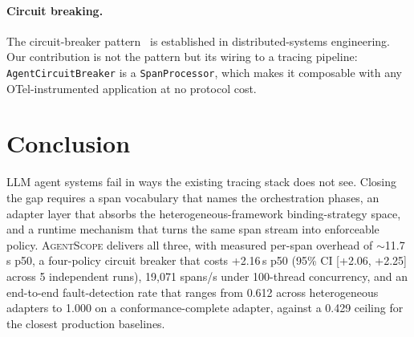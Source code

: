 \documentclass[sigplan,10pt,anonymous,review]{acmart}
\newcommand{\sysname}{\textsc{AgentScope}\xspace}
\begin{document}
\paragraph{Circuit breaking.}
The circuit-breaker pattern~\cite{circuit_breaker_pattern} is
established in distributed-systems engineering. Our contribution is
not the pattern but its wiring to a tracing pipeline:
\texttt{AgentCircuitBreaker} is a \texttt{SpanProcessor}, which makes
it composable with any OTel-instrumented application at no protocol
cost.

\section{Conclusion}
\label{sec:conclusion}

LLM agent systems fail in ways the existing tracing stack does not
see. Closing the gap requires a span vocabulary that names the
orchestration phases, an adapter layer that absorbs the
heterogeneous-framework binding-strategy space, and a runtime
mechanism that turns the same span stream into enforceable policy.
\sysname{} delivers all three, with measured per-span overhead of
$\sim$11.7\,\textmu{}s p50, a four-policy circuit breaker that costs
+2.16\,\textmu{}s p50 (95\% CI [+2.06, +2.25] across 5 independent
runs), 19{,}071 spans/s under 100-thread concurrency, and an
end-to-end fault-detection rate that ranges from 0.612 across
heterogeneous adapters to 1.000 on a conformance-complete adapter,
against a 0.429 ceiling for the closest production baselines.

\balance



\end{document}
